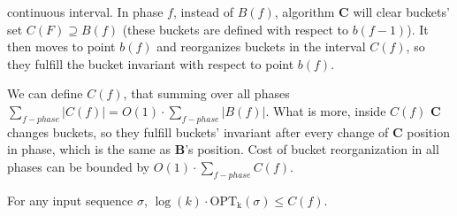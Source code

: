 continuous interval. In phase $f$, instead of $B(f)$, algorithm \textbf{C} will 
clear buckets' set $C(F) \supseteq B(f)$ (these buckets are defined with 
respect to $b(f-1)$). It then moves to point $b(f)$ and reorganizes buckets in 
the interval $C(f)$, so they fulfill the bucket invariant with respect to 
point $b(f)$. 
\begin{lemma}
We can define $C(f)$, that summing over all phases $\sum_{f - phase} |C(f)| = 
O(1) \cdot \sum_{f - phase} |B(f)|$. What is more, inside 
$C(f)$ \textbf{C} changes buckets, so they fulfill 
buckets' invariant after every change of 
\textbf{C} position in phase, which is the same as \textbf{B}'s position. Cost 
of bucket reorganization in all phases can be bounded 
by $O(1) \cdot \sum_{f-phase} C(f)$.
\end{lemma}
\begin{theorem}
 For any input sequence $\sigma$, $ \log(k) \cdot \mathrm{OPT_k}(\sigma) \leq
C(f)$.
\end{theorem}

